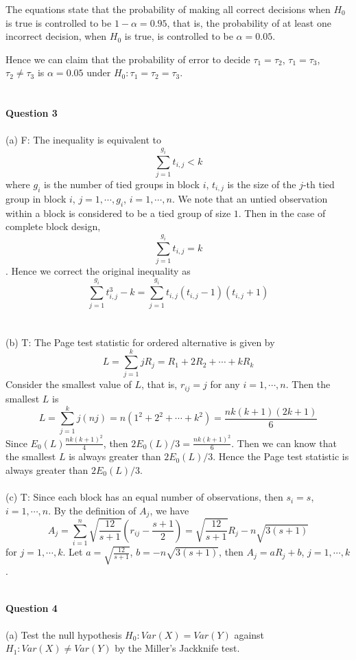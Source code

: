 \documentclass[12pt,a4paper]{article}
\begin{document}
The equations state that the probability of making all correct decisions when $H_{0}$ is true is controlled to be $1-\alpha=0.95$, that is, the probability of at least one incorrect decision, when $H_{0}$ is true, is controlled to be $\alpha=0.05$. 

Hence we can claim that the probability of error to decide $\tau_{1}=\tau_{2}$, $\tau_{1}=\tau_{3}$, $\tau_{2}\neq\tau_{3}$ is $\alpha=0.05$ under $H_{0}:\tau_{1}=\tau_{2}=\tau_{3}$.\\
~\\
~\\
\indent \textbf{Question 3}\\
~\\
(a) F: The inequality is equivalent to $$\sum_{j=1}^{g_{i}}t_{i,j}<k$$ where $g_{i}$ is the number of tied groups in block $i$, $t_{i,j}$ is the size of the $j$-th tied group in block $i$, $j=1,\cdots,g_{i}$, $i=1,\cdots,n$. We note that an untied observation within a block is considered to be a tied group of size $1$. Then in the case of complete block design, $$\sum_{j=1}^{g_{i}}t_{i,j}=k$$. Hence we correct the original inequality as $$\sum_{j=1}^{g_{i}}t_{i,j}^{3}-k=\sum_{j=1}^{g_{i}}t_{i,j}(t_{i,j}-1)(t_{i,j}+1)$$\\
~\\
(b) T: The Page test statistic for ordered alternative is given by $$L=\sum_{j=1}^{k}jR_{j}=R_{1}+2R_{2}+\cdots+kR_{k}$$ Consider the smallest value of $L$, that is, $r_{ij}=j$ for any $i=1,\cdots,n$. Then the smallest $L$ is  $$L=\sum_{j=1}^{k}j(nj)=n(1^{2}+2^{2}+\cdots+k^{2})=\frac{nk(k+1)(2k+1)}{6}$$ Since $E_{0}(L)\frac{nk(k+1)^{2}}{4}$, then $2E_{0}(L)/3=\frac{nk(k+1)^{2}}{6}$. Then we can know that the smallest $L$ is always greater than $2E_{0}(L)/3$. Hence the Page test statistic is always greater than $2E_{0}(L)/3$.\\
~\\
(c) T: Since each block has an equal number of observations, then $s_{i}=s$, $i=1,\cdots,n$. By the definition of $A_{j}$, we have $$A_{j}=\sum_{i=1}^{n}\sqrt{\frac{12}{s+1}}(r_{ij}-\frac{s+1}{2})=\sqrt{\frac{12}{s+1}}R_{j}-n\sqrt{3(s+1)}$$ for $j=1,\cdots,k$. Let $a=\sqrt{\frac{12}{s+1}}$, $b=-n\sqrt{3(s+1)}$, then $A_{j}=aR_{j}+b$, $j=1,\cdots,k$.

~\\
\indent \textbf{Question 4}\\
~\\
(a) Test the null hypothesis $H_{0}: Var(X)=Var(Y)$ against $H_{1}:Var(X)\neq Var(Y)$ by the Miller's Jackknife test. 
\end{document}
